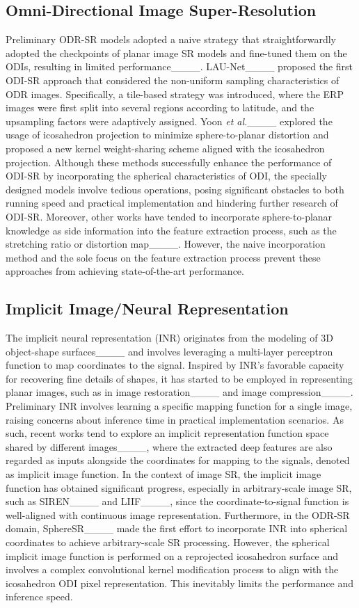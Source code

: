 \subsection{Omni-Directional Image Super-Resolution}
Preliminary ODR-SR models adopted a naive strategy that straightforwardly adopted the checkpoints of planar image SR models and fine-tuned them on the ODIs, resulting in limited performance____.
%
LAU-Net____ proposed the first ODI-SR approach that considered the non-uniform sampling characteristics of ODR images. Specifically, a tile-based strategy was introduced, where the ERP images were first split into several regions according to latitude, and the upsampling factors were adaptively assigned.
%
Yoon \textit{et al.}____ explored the usage of icosahedron projection to minimize sphere-to-planar distortion and proposed a new kernel weight-sharing scheme aligned with the icosahedron projection.
%
Although these methods successfully enhance the performance of ODI-SR by incorporating the spherical characteristics of ODI, the specially designed models involve tedious operations, posing significant obstacles to both running speed and practical implementation and hindering further research of ODI-SR.
%
Moreover, other works have tended to incorporate sphere-to-planar knowledge as side information into the feature extraction process, such as the stretching ratio or distortion map____.
%
However, the naive incorporation method and the sole focus on the feature extraction process prevent these approaches from achieving state-of-the-art performance.
%

\subsection{Implicit Image/Neural Representation}
The implicit neural representation (INR) originates from the modeling of 3D object-shape surfaces____ and involves leveraging a multi-layer perceptron function to map coordinates to the signal.
%
Inspired by INR's favorable capacity for recovering fine details of shapes, it has started to be employed in representing planar images, such as in image restoration____ and image compression____.
%
Preliminary INR involves learning a specific mapping function for a single image, raising concerns about inference time in practical implementation scenarios.
%
As such, recent works tend to explore an implicit representation function space shared by different images____, where the extracted deep features are also regarded as inputs alongside the coordinates for mapping to the signals, denoted as implicit image function.
%
In the context of image SR, the implicit image function has obtained significant progress, especially in arbitrary-scale image SR, such as SIREN____ and LIIF____, since the coordinate-to-signal function is well-aligned with continuous image representation.
%
Furthermore, in the ODR-SR domain, SphereSR____ made the first effort to incorporate INR into spherical coordinates to achieve arbitrary-scale SR processing.
%
However, the spherical implicit image function is performed on a reprojected icosahedron surface and involves a complex convolutional kernel modification process to align with the icosahedron ODI pixel representation. This inevitably limits the performance and inference speed.